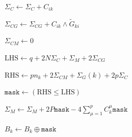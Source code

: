 \begin{algorithm}[b]
{{{{            $\Sigma_C\leftarrow\Sigma_C+C_{ik}$\;

            $\Sigma_{CG}
            \leftarrow
            \Sigma_{CG}
            +C_{ik}\wedge\tilde{G}_{ki}$
        }


        $\Sigma_{CM}\leftarrow0$\;



        $\mathrm{LHS}
        \leftarrow
        q
        +2N\Sigma_C
        +\Sigma_M
        +2\Sigma_{CG}$\;


        $\mathrm{RHS}
        \leftarrow
        p n_k
        +2\Sigma_{CM}
        +\Sigma_G(k)
        +2p\Sigma_C$\;


        $\mathtt{mask}
        \leftarrow
        (\mathrm{RHS}\leq\mathrm{LHS})$


        $\Sigma_M \leftarrow \Sigma_M
        + 2P\mathtt{mask}
        - 4\sum_{\mu=1}^{p}C_k^\mu\mathtt{mask}$\;

        $B_k
        \leftarrow
        B_k\oplus\mathtt{mask}$\;
    }
}
}
\label{alg:Hopfield_bitwise_overlaps}
\end{algorithm}
\linenumbers
